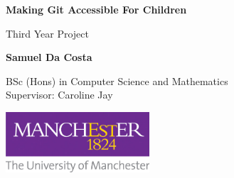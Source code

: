 \begin{titlepage}
   \begin{center}
       \vspace*{1cm}
 
       \LARGE\textbf{Making Git Accessible For Children}
 
       \vspace{0.5cm}
        Third Year Project
 
       \vspace{1.5cm}
 
       \textbf{Samuel Da Costa}
 
       \vfill
 
 	  
       BSc (Hons) in Computer Science and Mathematics\\
       Supervisor: Caroline Jay 
 
       \vspace{0.8cm}
 
       \includegraphics[width=0.4\textwidth]{figures/university}
 	\normalsize
 
   \end{center}
\end{titlepage}

